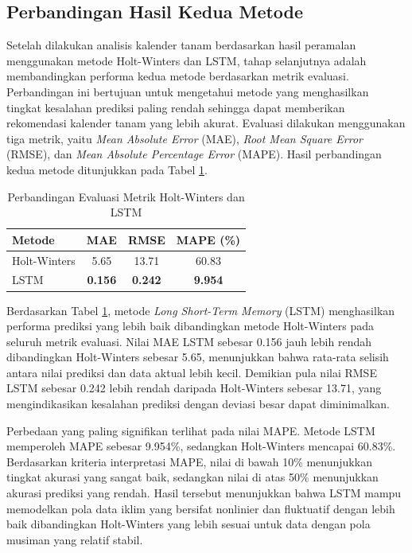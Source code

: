 \subsection{Perbandingan Hasil Kedua Metode}
Setelah dilakukan analisis kalender tanam berdasarkan hasil peramalan menggunakan metode Holt-Winters dan LSTM, tahap selanjutnya adalah membandingkan performa kedua metode berdasarkan metrik evaluasi. Perbandingan ini bertujuan untuk mengetahui metode yang menghasilkan tingkat kesalahan prediksi paling rendah sehingga dapat memberikan rekomendasi kalender tanam yang lebih akurat. Evaluasi dilakukan menggunakan tiga metrik, yaitu \textit{Mean Absolute Error} (MAE), \textit{Root Mean Square Error} (RMSE), dan \textit{Mean Absolute Percentage Error} (MAPE). Hasil perbandingan kedua metode ditunjukkan pada Tabel \ref{tab:eval_hw_lstm}.
\begin{table}[H]
    \centering
    \caption{Perbandingan Evaluasi Metrik Holt-Winters dan LSTM}
    \label{tab:eval_hw_lstm}
    \small
    \renewcommand{\arraystretch}{1.2}
    \setlength{\tabcolsep}{7pt}
    \begin{tabular}{|l|c|c|c|}
        \hline
        \textbf{Metode} & \textbf{MAE} & \textbf{RMSE} & \textbf{MAPE (\%)} \\
        \hline
        Holt-Winters & 5.65 & 13.71 & 60.83 \\
        \hline
        LSTM & \textbf{0.156} & \textbf{0.242} & \textbf{9.954} \\
        \hline
    \end{tabular}
\end{table}
Berdasarkan Tabel \ref{tab:eval_hw_lstm}, metode \textit{Long Short-Term Memory} (LSTM) menghasilkan performa prediksi yang lebih baik dibandingkan metode Holt-Winters pada seluruh metrik evaluasi. Nilai MAE LSTM sebesar 0.156 jauh lebih rendah dibandingkan Holt-Winters sebesar 5.65, menunjukkan bahwa rata-rata selisih antara nilai prediksi dan data aktual lebih kecil. Demikian pula nilai RMSE LSTM sebesar 0.242 lebih rendah daripada Holt-Winters sebesar 13.71, yang mengindikasikan kesalahan prediksi dengan deviasi besar dapat diminimalkan.

Perbedaan yang paling signifikan terlihat pada nilai MAPE. Metode LSTM memperoleh MAPE sebesar 9.954\%, sedangkan Holt-Winters mencapai 60.83\%. Berdasarkan kriteria interpretasi MAPE, nilai di bawah 10\% menunjukkan tingkat akurasi yang sangat baik, sedangkan nilai di atas 50\% menunjukkan akurasi prediksi yang rendah. Hasil tersebut menunjukkan bahwa LSTM mampu memodelkan pola data iklim yang bersifat nonlinier dan fluktuatif dengan lebih baik dibandingkan Holt-Winters yang lebih sesuai untuk data dengan pola musiman yang relatif stabil.

